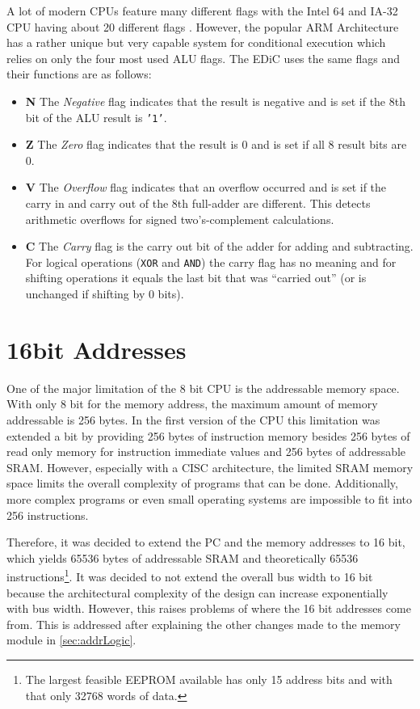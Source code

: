 A lot of modern \glspl{CPU} feature many different flags with the Intel 64\textsuperscript{\textregistered} and IA-32 \gls{CPU} having about 20 different flags \cite[Section~3.4.3]{intelx86}.
However, the popular ARM Architecture has a rather unique but very capable system for conditional execution which relies on only the four most used \gls{ALU} flags.
The \gls{EDiC} uses the same flags and their functions are as follows:
\begin{itemize}
  \item \textbf{N} The \emph{Negative} flag indicates that the result is negative and is set if the 8th bit of the \gls{ALU} result is \texttt{'1'}.
  \item \textbf{Z} The \emph{Zero} flag indicates that the result is 0 and is set if all 8 result bits are 0.
  \item \textbf{V} The \emph{Overflow} flag indicates that an overflow occurred and is set if the carry in and carry out of the 8th full-adder are different.
  This detects arithmetic overflows for signed two's-complement calculations.
  \item \textbf{C} The \emph{Carry} flag is the carry out bit of the adder for adding and subtracting.
  For logical operations (\texttt{XOR} and \texttt{AND}) the carry flag has no meaning and for shifting operations it equals the last bit that was ``carried out'' (or is unchanged if shifting by 0 bits).
\end{itemize}

\section{16bit Addresses}
One of the major limitation of the 8 bit \gls{CPU} is the addressable memory space.
With only 8 bit for the memory address, the maximum amount of memory addressable is 256 bytes.
In the first version of the \gls{CPU} this limitation was extended a bit by providing 256 bytes of instruction memory besides 256 bytes of read only memory for instruction immediate values and 256 bytes of addressable \gls{SRAM}.
However, especially with a \gls{CISC} architecture, the limited \gls{SRAM} memory space limits the overall complexity of programs that can be done.
Additionally, more complex programs or even small operating systems are impossible to fit into 256 instructions.

Therefore, it was decided to extend the \gls{PC} and the memory addresses to 16 bit, which yields 65536 bytes of addressable \gls{SRAM} and theoretically 65536 instructions\footnote{The largest feasible \gls{EEPROM} available has only 15 address bits and with that only 32768 words of data.}.
It was decided to not extend the overall bus width to 16 bit because the architectural complexity of the design can increase exponentially with bus width.
However, this raises problems of where the 16 bit addresses come from.
This is addressed after explaining the other changes made to the memory module in \cref{sec:addrLogic}.

